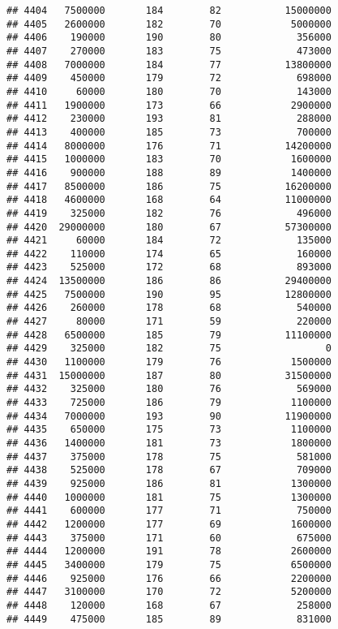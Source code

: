 \documentclass[
]{article}
\begin{document}
\begin{verbatim}
## 4404   7500000       184        82           15000000
## 4405   2600000       182        70            5000000
## 4406    190000       190        80             356000
## 4407    270000       183        75             473000
## 4408   7000000       184        77           13800000
## 4409    450000       179        72             698000
## 4410     60000       180        70             143000
## 4411   1900000       173        66            2900000
## 4412    230000       193        81             288000
## 4413    400000       185        73             700000
## 4414   8000000       176        71           14200000
## 4415   1000000       183        70            1600000
## 4416    900000       188        89            1400000
## 4417   8500000       186        75           16200000
## 4418   4600000       168        64           11000000
## 4419    325000       182        76             496000
## 4420  29000000       180        67           57300000
## 4421     60000       184        72             135000
## 4422    110000       174        65             160000
## 4423    525000       172        68             893000
## 4424  13500000       186        86           29400000
## 4425   7500000       190        95           12800000
## 4426    260000       178        68             540000
## 4427     80000       171        59             220000
## 4428   6500000       185        79           11100000
## 4429    325000       182        75                  0
## 4430   1100000       179        76            1500000
## 4431  15000000       187        80           31500000
## 4432    325000       180        76             569000
## 4433    725000       186        79            1100000
## 4434   7000000       193        90           11900000
## 4435    650000       175        73            1100000
## 4436   1400000       181        73            1800000
## 4437    375000       178        75             581000
## 4438    525000       178        67             709000
## 4439    925000       186        81            1300000
## 4440   1000000       181        75            1300000
## 4441    600000       177        71             750000
## 4442   1200000       177        69            1600000
## 4443    375000       171        60             675000
## 4444   1200000       191        78            2600000
## 4445   3400000       179        75            6500000
## 4446    925000       176        66            2200000
## 4447   3100000       170        72            5200000
## 4448    120000       168        67             258000
## 4449    475000       185        89             831000

\end{verbatim}
\end{document}
